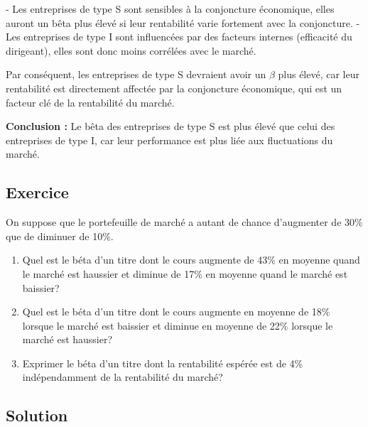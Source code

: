 \documentclass[a4paper, 12pt]{report}
\begin{document}
\begin{enumerate}
	- Les entreprises de type S sont sensibles à la conjoncture économique, elles auront un bêta plus élevé si leur rentabilité varie fortement avec la conjoncture.
	- Les entreprises de type I sont influencées par des facteurs internes (efficacité du dirigeant), elles sont donc moins corrélées avec le marché.
	
	Par conséquent, les entreprises de type S devraient avoir un \(\beta\) plus élevé, car leur rentabilité est directement affectée par la conjoncture économique, qui est un facteur clé de la rentabilité du marché.
	
	\textbf{Conclusion :} Le bêta des entreprises de type S est plus élevé que celui des entreprises de type I, car leur performance est plus liée aux fluctuations du marché.
	
\end{enumerate}

\subsection{Exercice}


On suppose que le portefeuille de marché a autant de chance d'augmenter de 30\% que de diminuer de 10\%. 

\begin{enumerate}
	\item Quel est le béta d'un titre dont le cours augmente de 43\% en moyenne quand le marché est haussier et diminue de 17\% en moyenne quand le marché est baissier?
	\item Quel est le béta d'un titre dont le cours augmente en moyenne de 18\% lorsque le marché est baissier et diminue en moyenne de 22\% lorsque le marché est haussier?
	\item Exprimer le béta d'un titre dont la rentabilité espérée est de 4\% indépendamment de la rentabilité du marché?
\end{enumerate}

\subsection{Solution}
\end{document}

